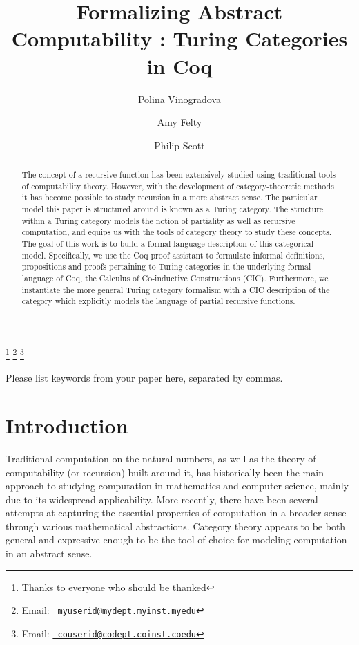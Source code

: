 \documentclass{entcs} \usepackage{entcsmacro}
\begin{document}
\begin{frontmatter}
  \title{Formalizing Abstract Computability : Turing Categories in Coq} 
  \author{Polina Vinogradova
  	}
  \address{Electrical Engineering and Computer Science\\ University of Ottawa\\
    Ottawa, Canada} 
 \author{Amy Felty}
  \address{Electrical Engineering and Computer Science\\University of Ottawa\\
    Ottawa, Canada} \thanks[ALL]{Thanks
    to everyone who should be thanked} \thanks[myemail]{Email:
    \href{mailto:myuserid@mydept.myinst.myedu} {\texttt{\normalshape
        myuserid@mydept.myinst.myedu}}} \thanks[coemail]{Email:
    \href{mailto:couserid@codept.coinst.coedu} {\texttt{\normalshape
        couserid@codept.coinst.coedu}}}
 \author{Philip Scott}
  \address{Mathematics and Statistics\\ University of Ottawa\\
    Ottawa, Canada} 

\begin{abstract} 
  	The concept of a recursive function has been extensively studied using traditional tools of computability theory. However, with the development of category-theoretic methods it has become possible to study recursion in a more abstract sense. The particular model this paper is structured around is known as a Turing category. The structure within a Turing category models the notion of partiality as well as recursive computation, and equips us with the tools of category theory to study these concepts. The goal of this work is to build a formal language description of this categorical model. Specifically, we use the Coq proof assistant to formulate informal definitions, propositions and proofs pertaining to Turing categories in the underlying formal language of Coq, the Calculus of Co-inductive Constructions (CIC). Furthermore, we instantiate the more general Turing category formalism with a CIC description of the category which explicitly models the language of partial recursive functions.
\end{abstract}
\begin{keyword}
  Please list keywords from your paper here, separated by commas.
\end{keyword}
\end{frontmatter}
\section{Introduction}\label{intro}
Traditional computation on the natural numbers, as well as the theory of computability (or recursion) built around it, 
has historically been the main approach to studying computation in mathematics and computer science, mainly due to its widespread applicability. More recently, there have been several attempts at capturing the essential properties of computation in a broader sense through various mathematical abstractions. Category theory appears to be both general and expressive enough to be the tool of choice for modeling computation in an abstract sense. 
\end{document}
